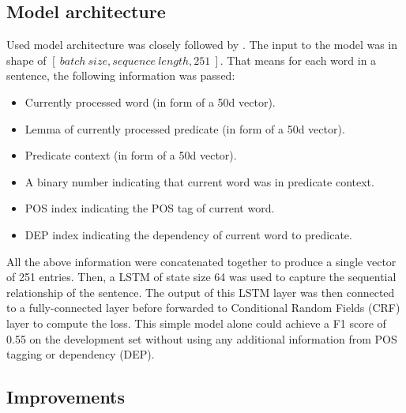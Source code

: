 \documentclass{scrartcl}
\begin{document}
\subsection{Model architecture}
Used model architecture was closely followed by \cite{ARTICLE:1}. The input to the model
was in shape of $[\ batch \ size, sequence \ length, 251 \ ].$ That means for each
word in a sentence, the following information was passed:
\begin{itemize}
\item Currently processed word (in form of a 50d vector).
\item Lemma of currently processed predicate (in form of a 50d vector).
\item Predicate context (in form of a 50d vector).
\item A binary number indicating that current word was in predicate context.
\item POS index indicating the POS tag of current word.
\item DEP index indicating the dependency of current word to predicate.
\end{itemize}

\noindent
All the above information were concatenated together to produce a single vector
of 251 entries.
Then, a LSTM of state size 64 was used to capture the sequential relationship of the sentence.
The output of this LSTM layer was then connected to a fully-connected layer
before forwarded to Conditional Random Fields (CRF) \cite{a7} layer to compute the loss.
This simple model alone could achieve a F1 score of 0.55 on the development set
without using any additional information from POS tagging or dependency (DEP).
\subsection{Improvements}
\end{document}
